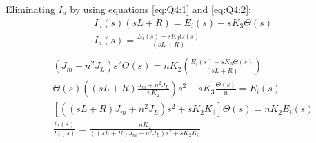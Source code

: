 \documentclass[12pt]{article}
\begin{document}
Eliminating $I_a$ by using equations \ref{eq:Q4:1} and \ref{eq:Q4:2}: \newline
\begin{align*}
& I_a(s)(sL+R)=E_i(s)-sK_3\Theta(s) \\
& I_a(s)= \frac{E_i(s)-sK_3\Theta(s)}{(sL+R)} \\
\end{align*}
\begin{align*}
& (J_m+n^2J_L)s^2\Theta(s)= nK_2 \left(\frac{E_i(s)-sK_3\Theta(s)}{(sL+R)} \right) \\
& \Theta(s)\left((sL+R)\frac{J_m+n^2J_L}{nK_2}\right)s^2 + sK_3 \frac{\Theta(s)}{n}=E_i(s) \\
& \left[\left((sL+R) J_m+n^2J_L \right)s^2 + sK_2K_3 \right]\Theta(s) = nK_2E_i(s) \\
& \boxed{\frac{\Theta(s)}{E_i(s)}= \frac{nK_2}{\left((sL+R) J_m+n^2J_L \right)s^2 + sK_2K_3 } }
\end{align*}
\end{document}
